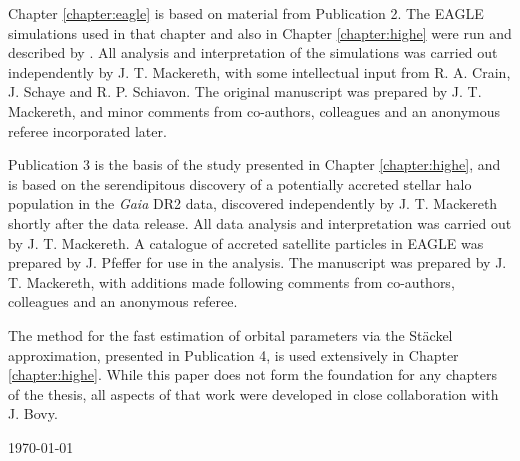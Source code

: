 Chapter \ref{chapter:eagle} is based on material from Publication 2. The EAGLE simulations used in that chapter and also in Chapter \ref{chapter:highe} were run and described by \citet{2015MNRAS.446..521S,2015MNRAS.450.1937C}. All analysis and interpretation of the simulations was carried out independently by J. T. Mackereth, with some intellectual input from R. A. Crain, J. Schaye and R. P. Schiavon. The original manuscript was prepared by J. T. Mackereth, and minor comments from co-authors, colleagues and an anonymous referee incorporated later.

Publication 3 is the basis of the study presented in Chapter \ref{chapter:highe}, and is based on the serendipitous discovery of a potentially accreted stellar halo population in the \emph{Gaia} DR2 data, discovered independently by J. T. Mackereth shortly after the data release. All data analysis and interpretation was carried out by J. T. Mackereth. A catalogue of accreted satellite particles in EAGLE was prepared by J. Pfeffer for use in the analysis. The manuscript was prepared by J. T. Mackereth, with additions made following comments from co-authors, colleagues and an anonymous referee.

The method for the fast estimation of orbital parameters via the St\"ackel approximation, presented in Publication 4, is used extensively in Chapter \ref{chapter:highe}. While this paper does not form the foundation for any chapters of the thesis, all aspects of that work were developed in close collaboration with J. Bovy.



\vfill
{\sc \AuthorName \hfill\today}